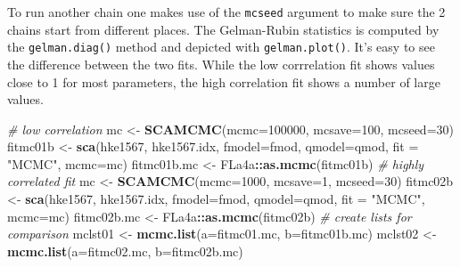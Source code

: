 \documentclass[
]{book}
\newenvironment{Shaded}{\begin{snugshade}}{\end{snugshade}}
\newcommand{\AttributeTok}[1]{\textcolor[rgb]{0.13,0.29,0.53}{#1}}
\newcommand{\CommentTok}[1]{\textcolor[rgb]{0.56,0.35,0.01}{\textit{#1}}}
\newcommand{\DecValTok}[1]{\textcolor[rgb]{0.00,0.00,0.81}{#1}}
\newcommand{\FunctionTok}[1]{\textcolor[rgb]{0.13,0.29,0.53}{\textbf{#1}}}
\newcommand{\NormalTok}[1]{#1}
\newcommand{\OtherTok}[1]{\textcolor[rgb]{0.56,0.35,0.01}{#1}}
\newcommand{\SpecialCharTok}[1]{\textcolor[rgb]{0.81,0.36,0.00}{\textbf{#1}}}
\newcommand{\StringTok}[1]{\textcolor[rgb]{0.31,0.60,0.02}{#1}}
\begin{document}
To run another chain one makes use of the \texttt{mcseed} argument to make sure the 2 chains start from different places. The Gelman-Rubin statistics is computed by the \texttt{gelman.diag()} method and depicted with \texttt{gelman.plot()}. It's easy to see the difference between the two fits. While the low corrrelation fit shows values close to 1 for most parameters, the high correlation fit shows a number of large values.

\begin{Shaded}
\begin{Highlighting}[]
\CommentTok{\# low correlation}
\NormalTok{mc }\OtherTok{\textless{}{-}} \FunctionTok{SCAMCMC}\NormalTok{(}\AttributeTok{mcmc=}\DecValTok{100000}\NormalTok{, }\AttributeTok{mcsave=}\DecValTok{100}\NormalTok{, }\AttributeTok{mcseed=}\DecValTok{30}\NormalTok{)}
\NormalTok{fitmc01b }\OtherTok{\textless{}{-}} \FunctionTok{sca}\NormalTok{(hke1567, hke1567.idx, }\AttributeTok{fmodel=}\NormalTok{fmod, }\AttributeTok{qmodel=}\NormalTok{qmod, }\AttributeTok{fit =} \StringTok{"MCMC"}\NormalTok{, }\AttributeTok{mcmc=}\NormalTok{mc)}
\NormalTok{fitmc01b.mc }\OtherTok{\textless{}{-}}\NormalTok{ FLa4a}\SpecialCharTok{::}\FunctionTok{as.mcmc}\NormalTok{(fitmc01b)}
\CommentTok{\# highly correlated fit}
\NormalTok{mc }\OtherTok{\textless{}{-}} \FunctionTok{SCAMCMC}\NormalTok{(}\AttributeTok{mcmc=}\DecValTok{1000}\NormalTok{, }\AttributeTok{mcsave=}\DecValTok{1}\NormalTok{, }\AttributeTok{mcseed=}\DecValTok{30}\NormalTok{)}
\NormalTok{fitmc02b }\OtherTok{\textless{}{-}} \FunctionTok{sca}\NormalTok{(hke1567, hke1567.idx, }\AttributeTok{fmodel=}\NormalTok{fmod, }\AttributeTok{qmodel=}\NormalTok{qmod, }\AttributeTok{fit =} \StringTok{"MCMC"}\NormalTok{, }\AttributeTok{mcmc=}\NormalTok{mc)}
\NormalTok{fitmc02b.mc }\OtherTok{\textless{}{-}}\NormalTok{ FLa4a}\SpecialCharTok{::}\FunctionTok{as.mcmc}\NormalTok{(fitmc02b)}
\CommentTok{\# create lists for comparison}
\NormalTok{mclst01 }\OtherTok{\textless{}{-}} \FunctionTok{mcmc.list}\NormalTok{(}\AttributeTok{a=}\NormalTok{fitmc01.mc, }\AttributeTok{b=}\NormalTok{fitmc01b.mc)}
\NormalTok{mclst02 }\OtherTok{\textless{}{-}} \FunctionTok{mcmc.list}\NormalTok{(}\AttributeTok{a=}\NormalTok{fitmc02.mc, }\AttributeTok{b=}\NormalTok{fitmc02b.mc)}
\end{Highlighting}
\end{Shaded}
\end{document}
